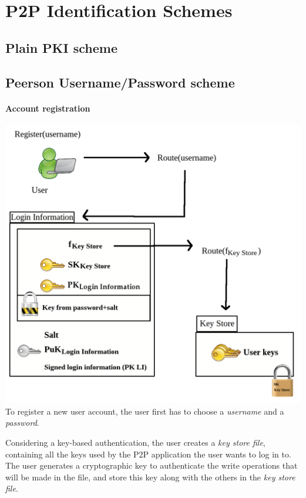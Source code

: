 \section{P2P Identification Schemes}
\subsection{Plain PKI scheme}
\subsection{Peerson Username/Password scheme}
%
\paragraph{Account registration}
\includegraphics[width=14cm]{../img/user_registration}\\
To register a new user account, the user first
has to choose a \textit{username} and a \textit{password}.

Considering a key-based authentication, the user creates a \textit{key store file}, containing all the
keys used by the P2P application the user wants to log in to.
The user generates a cryptographic key to authenticate the write operations
that will be made in the file, and store this key along with the others in the
\textit{key store file}.


